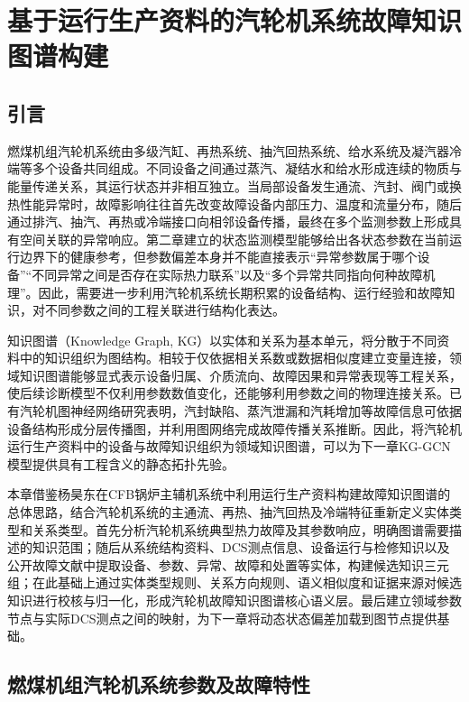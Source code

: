 \section{基于运行生产资料的汽轮机系统故障知识图谱构建}
\label{sec:knowledge_graph_v3}

\subsection{引言}

燃煤机组汽轮机系统由多级汽缸、再热系统、抽汽回热系统、给水系统及凝汽器冷端等多个设备共同组成。不同设备之间通过蒸汽、凝结水和给水形成连续的物质与能量传递关系，其运行状态并非相互独立。当局部设备发生通流、汽封、阀门或换热性能异常时，故障影响往往首先改变故障设备内部压力、温度和流量分布，随后通过排汽、抽汽、再热或冷端接口向相邻设备传播，最终在多个监测参数上形成具有空间关联的异常响应。第二章建立的状态监测模型能够给出各状态参数在当前运行边界下的健康参考，但参数偏差本身并不能直接表示“异常参数属于哪个设备”“不同异常之间是否存在实际热力联系”以及“多个异常共同指向何种故障机理”。因此，需要进一步利用汽轮机系统长期积累的设备结构、运行经验和故障知识，对不同参数之间的工程关联进行结构化表达。

知识图谱（Knowledge Graph, KG）以实体和关系为基本单元，将分散于不同资料中的知识组织为图结构\cite{Hogan2021KnowledgeGraphs}。相较于仅依据相关系数或数据相似度建立变量连接，领域知识图谱能够显式表示设备归属、介质流向、故障因果和异常表现等工程关系，使后续诊断模型不仅利用参数数值变化，还能够利用参数之间的物理连接关系。已有汽轮机图神经网络研究表明，汽封缺陷、蒸汽泄漏和汽耗增加等故障信息可依据设备结构形成分层传播图，并利用图网络完成故障传播关系推断\cite{ZhangHu2021FaultPropagationGNN}。因此，将汽轮机运行生产资料中的设备与故障知识组织为领域知识图谱，可以为下一章KG-GCN模型提供具有工程含义的静态拓扑先验。

本章借鉴杨昊东在CFB锅炉主辅机系统中利用运行生产资料构建故障知识图谱的总体思路\cite{YangHaodong2026CFB}，结合汽轮机系统的主通流、再热、抽汽回热及冷端特征重新定义实体类型和关系类型。首先分析汽轮机系统典型热力故障及其参数响应，明确图谱需要描述的知识范围；随后从系统结构资料、DCS测点信息、设备运行与检修知识以及公开故障文献中提取设备、参数、异常、故障和处置等实体，构建候选知识三元组；在此基础上通过实体类型规则、关系方向规则、语义相似度和证据来源对候选知识进行校核与归一化，形成汽轮机故障知识图谱核心语义层。最后建立领域参数节点与实际DCS测点之间的映射，为下一章将动态状态偏差加载到图节点提供基础。

\subsection{燃煤机组汽轮机系统参数及故障特性}
\label{subsec:turbine_fault_characteristics_v3}

